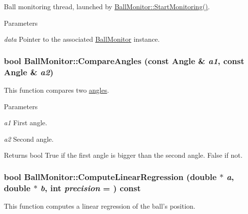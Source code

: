 Ball monitoring thread, launched by \hyperlink{classBallMonitor_a4d2b3aa764f5d4f4d5f58b7530565f90}{BallMonitor::StartMonitoring()}. 


\begin{DoxyParams}{Parameters}
\item[{\em data}]Pointer to the associated \hyperlink{classBallMonitor}{BallMonitor} instance. \end{DoxyParams}
\hypertarget{classBallMonitor_a78114ec7fc20317f84491e428dd8c126}{
\subsubsection[{CompareAngles}]{\setlength{\rightskip}{0pt plus 5cm}bool BallMonitor::CompareAngles (const {\bf Angle} \& {\em a1}, \/  const {\bf Angle} \& {\em a2})}}
\label{classBallMonitor_a78114ec7fc20317f84491e428dd8c126}


This function compares two \hyperlink{structBallMonitor_1_1Angle}{angles}. 


\begin{DoxyParams}{Parameters}
\item[{\em a1}]First angle. \item[{\em a2}]Second angle. \end{DoxyParams}
\begin{DoxyReturn}{Returns}
bool True if the first angle is bigger than the second angle. False if not. 
\end{DoxyReturn}
\hypertarget{classBallMonitor_a49645db55ca752adbc2a5a074c7314be}{
\subsubsection[{ComputeLinearRegression}]{\setlength{\rightskip}{0pt plus 5cm}bool BallMonitor::ComputeLinearRegression (double $\ast$ {\em a}, \/  double $\ast$ {\em b}, \/  int {\em precision} = {}) const}}
\label{classBallMonitor_a49645db55ca752adbc2a5a074c7314be}


This function computes a linear regression of the ball's position. 


